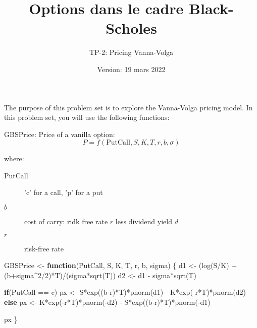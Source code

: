 \documentclass[
]{article}
\title{Options dans le cadre Black-Scholes}
\subtitle{TP-2: Pricing Vanna-Volga}
\author{}
\date{\vspace{-2.5em}Version: 19 mars 2022}
\newenvironment{Shaded}{\begin{snugshade}}{\end{snugshade}}
\newcommand{\ControlFlowTok}[1]{\textcolor[rgb]{0.13,0.29,0.53}{\textbf{#1}}}
\newcommand{\DecValTok}[1]{\textcolor[rgb]{0.00,0.00,0.81}{#1}}
\newcommand{\FunctionTok}[1]{\textcolor[rgb]{0.00,0.00,0.00}{#1}}
\newcommand{\NormalTok}[1]{#1}
\newcommand{\OtherTok}[1]{\textcolor[rgb]{0.56,0.35,0.01}{#1}}
\newcommand{\SpecialCharTok}[1]{\textcolor[rgb]{0.00,0.00,0.00}{#1}}
\newcommand{\StringTok}[1]{\textcolor[rgb]{0.31,0.60,0.02}{#1}}
\begin{document}
\maketitle

The purpose of this problem set is to explore the Vanna-Volga pricing
model. In this problem set, you will use the following functions:

GBSPrice: Price of a vanilla option: \[
P = f(\text{PutCall}, S, K, T, r, b, \sigma)
\]

where:

\begin{description}
\item[PutCall] 'c' for a call, 'p' for a put
\item[$b$] cost of carry: ridk free rate $r$ less dividend yield $d$
\item[$r$] risk-free rate
\end{description}

\begin{Shaded}
\begin{Highlighting}[]
\NormalTok{GBSPrice }\OtherTok{\textless{}{-}} \ControlFlowTok{function}\NormalTok{(PutCall, S, K, T, r, b, sigma) \{}
\NormalTok{  d1 }\OtherTok{\textless{}{-}}\NormalTok{ (}\FunctionTok{log}\NormalTok{(S}\SpecialCharTok{/}\NormalTok{K) }\SpecialCharTok{+}\NormalTok{ (b}\SpecialCharTok{+}\NormalTok{sigma}\SpecialCharTok{\^{}}\DecValTok{2}\SpecialCharTok{/}\DecValTok{2}\NormalTok{)}\SpecialCharTok{*}\NormalTok{T)}\SpecialCharTok{/}\NormalTok{(sigma}\SpecialCharTok{*}\FunctionTok{sqrt}\NormalTok{(T))}
\NormalTok{  d2 }\OtherTok{\textless{}{-}}\NormalTok{ d1 }\SpecialCharTok{{-}}\NormalTok{ sigma}\SpecialCharTok{*}\FunctionTok{sqrt}\NormalTok{(T)}

  \ControlFlowTok{if}\NormalTok{(PutCall }\SpecialCharTok{==} \StringTok{\textquotesingle{}c\textquotesingle{}}\NormalTok{)  }
\NormalTok{    px }\OtherTok{\textless{}{-}}\NormalTok{ S}\SpecialCharTok{*}\FunctionTok{exp}\NormalTok{((b}\SpecialCharTok{{-}}\NormalTok{r)}\SpecialCharTok{*}\NormalTok{T)}\SpecialCharTok{*}\FunctionTok{pnorm}\NormalTok{(d1) }\SpecialCharTok{{-}}\NormalTok{ K}\SpecialCharTok{*}\FunctionTok{exp}\NormalTok{(}\SpecialCharTok{{-}}\NormalTok{r}\SpecialCharTok{*}\NormalTok{T)}\SpecialCharTok{*}\FunctionTok{pnorm}\NormalTok{(d2)}
  \ControlFlowTok{else}
\NormalTok{    px }\OtherTok{\textless{}{-}}\NormalTok{ K}\SpecialCharTok{*}\FunctionTok{exp}\NormalTok{(}\SpecialCharTok{{-}}\NormalTok{r}\SpecialCharTok{*}\NormalTok{T)}\SpecialCharTok{*}\FunctionTok{pnorm}\NormalTok{(}\SpecialCharTok{{-}}\NormalTok{d2) }\SpecialCharTok{{-}}\NormalTok{ S}\SpecialCharTok{*}\FunctionTok{exp}\NormalTok{((b}\SpecialCharTok{{-}}\NormalTok{r)}\SpecialCharTok{*}\NormalTok{T)}\SpecialCharTok{*}\FunctionTok{pnorm}\NormalTok{(}\SpecialCharTok{{-}}\NormalTok{d1)}

\NormalTok{px}
\NormalTok{\}}
\end{Highlighting}
\end{Shaded}
\end{document}

